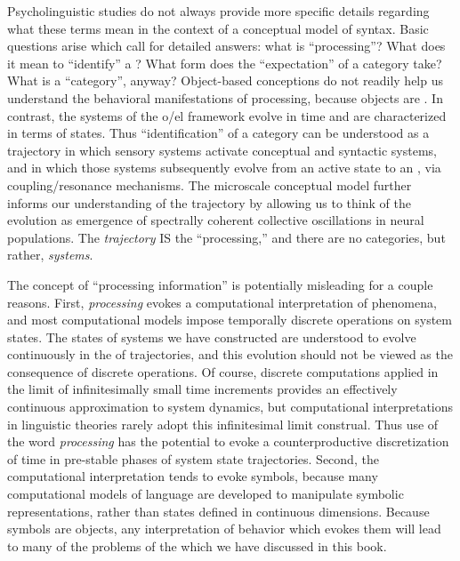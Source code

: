 Psycholinguistic studies do not always provide more specific details regarding what these terms mean in the context of a conceptual model of syntax. Basic questions arise which call for detailed answers: what is “processing”? What does it mean to “identify” a ? What form does the “expectation” of a category take? What is a “category”, anyway? Object-based conceptions do not readily help us understand the behavioral manifestations of processing, because objects are . In contrast, the systems of the o/el framework evolve in time and are characterized in terms of states. Thus “identification” of a category can be understood as a  trajectory in which sensory systems activate conceptual and syntactic systems, and in which those systems subsequently evolve from an active state to an , via coupling/resonance mechanisms. The microscale conceptual model further informs our understanding of the trajectory by allowing us to think of the evolution as emergence of spectrally coherent collective oscillations in neural populations. The \textit{trajectory} IS the “processing,” and there are no categories, but rather, \textit{systems}.

The concept of “processing information” is potentially misleading for a couple reasons. First, \textit{processing} evokes a computational interpretation of phenomena, and most computational models impose temporally discrete operations on system states. The states of systems we have constructed are understood to evolve continuously in the  of trajectories, and this evolution should not be viewed as the consequence of discrete operations. Of course, discrete computations applied in the limit of infinitesimally small time increments provides an effectively continuous approximation to system dynamics, but computational interpretations in linguistic theories rarely adopt this infinitesimal limit construal. Thus use of the word \textit{processing} has the potential to evoke a counterproductive discretization of time in pre-stable phases of system state trajectories. Second, the computational interpretation tends to evoke symbols, because many computational models of language are developed to manipulate symbolic representations, rather than states defined in continuous dimensions. Because symbols are objects, any interpretation of behavior which evokes them will lead to many of the problems of the  which we have discussed in this book. 

